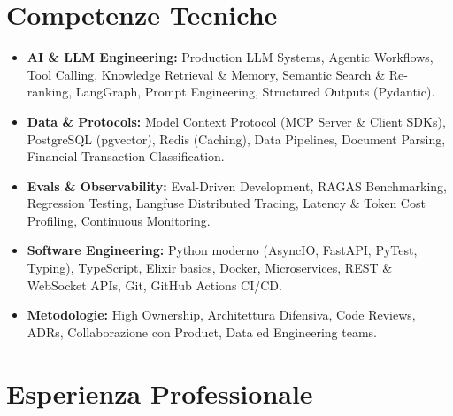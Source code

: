 \documentclass[a4paper,10pt]{article}
\begin{document}
\section{Competenze Tecniche}
\begin{itemize}[leftmargin=1.2em, itemsep=2pt]
  \item \textbf{AI \& LLM Engineering:} Production LLM Systems, Agentic Workflows, Tool Calling, Knowledge Retrieval \& Memory, Semantic Search \& Re-ranking, LangGraph, Prompt Engineering, Structured Outputs (Pydantic).
  \item \textbf{Data \& Protocols:} Model Context Protocol (MCP Server \& Client SDKs), PostgreSQL (pgvector), Redis (Caching), Data Pipelines, Document Parsing, Financial Transaction Classification.
  \item \textbf{Evals \& Observability:} Eval-Driven Development, RAGAS Benchmarking, Regression Testing, Langfuse Distributed Tracing, Latency \& Token Cost Profiling, Continuous Monitoring.
  \item \textbf{Software Engineering:} Python moderno (AsyncIO, FastAPI, PyTest, Typing), TypeScript, Elixir basics, Docker, Microservices, REST \& WebSocket APIs, Git, GitHub Actions CI/CD.
  \item \textbf{Metodologie:} High Ownership, Architettura Difensiva, Code Reviews, ADRs, Collaborazione con Product, Data ed Engineering teams.
\end{itemize}

\section{Esperienza Professionale}
\end{document}
